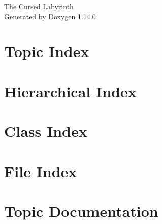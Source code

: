 \documentclass[twoside]{book}
\newcommand{\+}{\discretionary{\mbox{\scriptsize$\hookleftarrow$}}{}{}}
\newcommand{\clearemptydoublepage}{%
    \newpage{\pagestyle{empty}\cleardoublepage}%
  }
\begin{document}
  \raggedbottom
    \hypersetup{pageanchor=false,
                bookmarksnumbered=true,
                pdfencoding=unicode
               }
  \begin{titlepage}
  \vspace*{7cm}
  \begin{center}%
  {\Large The Cursed Labyrinth}\\
  \vspace*{1cm}
  {\large Generated by Doxygen 1.14.0}\\
  \end{center}
  \end{titlepage}
  \clearemptydoublepage
  \tableofcontents
  \clearemptydoublepage
  \hypersetup{pageanchor=true}

\chapter{Topic Index}

\chapter{Hierarchical Index}

\chapter{Class Index}

\chapter{File Index}

\chapter{Topic Documentation}





\end{document}
